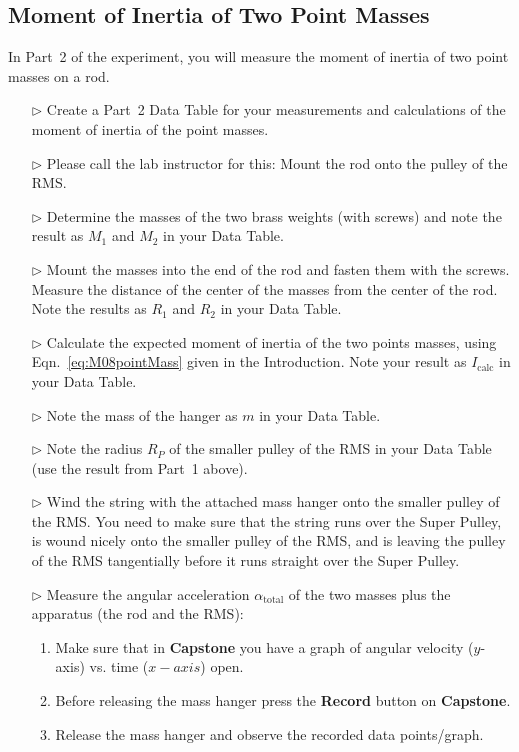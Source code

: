 \subsection{Moment of Inertia of Two Point Masses}
In Part~2 of the experiment, you will measure the moment of inertia of two point masses on a rod. 
\begin{itemize}
\item[$\triangleright$] Create a Part~2 Data Table for your measurements and calculations of the moment of inertia of the point masses.
\item[$\triangleright$] Please call the lab instructor for this: Mount the rod onto the pulley of the RMS.
\item[$\triangleright$] Determine the masses of the two brass weights (with screws) and note the result as $M_1$ and $M_2$ in your Data Table.
\item[$\triangleright$] Mount the masses into the end of the rod and fasten them with the screws. Measure the distance of the center of the masses from the center of the rod. Note the results as $R_1$ and $R_2$ in your Data Table.
\item[$\triangleright$] Calculate the expected moment of inertia of the two points masses, using Eqn.~\ref{eq:M08pointMass} given in the Introduction. Note your result as $I_{\mbox{calc}}$ in your Data Table.
\item[$\triangleright$] Note the mass of the hanger as $m$ in your Data Table.
\item[$\triangleright$] Note the radius $R_{P}$ of the smaller pulley of the RMS in your Data Table (use the result from Part~1 above).
\item[$\triangleright$] Wind the string with the attached mass hanger onto the smaller pulley of the RMS. You need to make sure that the string runs over the Super Pulley, is wound nicely onto the smaller pulley of the RMS, and is leaving the pulley of the RMS tangentially before it runs straight over the Super Pulley.
\item[$\triangleright$] Measure the angular acceleration $\alpha_{\mbox{total}}$ of the two masses plus the apparatus (the rod and the RMS):
  \begin{enumerate}
  \item Make sure that in \textbf{Capstone} you have a graph of angular velocity ($y$-axis) vs. time ($x-axis$) open.
  \item Before releasing the mass hanger press the \textbf{Record} button on \textbf{Capstone}.
  \item Release the mass hanger and observe the recorded data points/graph.

\end{enumerate}
\end{itemize}
